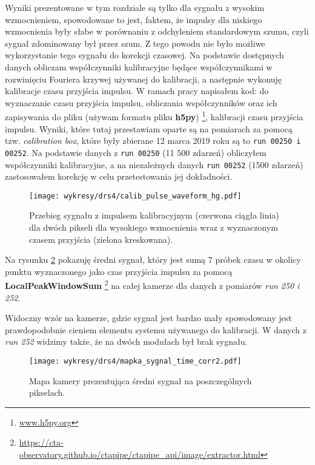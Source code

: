 \documentclass[a4paper,11pt,twoside]{article}
\begin{document}
Wyniki prezentowane w tym rozdziale są tylko dla sygnału z wysokim wzmocnieniem, spowodowane to jest, faktem, że impulsy dla niskiego wzmocnienia były słabe w porównaniu z odchyleniem standardowym szumu, czyli sygnał zdominowany był przez szum. Z tego powodu nie było możliwe wykorzystanie tego sygnału do korekcji czasowej. Na podstawie dostępnych danych obliczam współczynniki kalibracyjne będące współczynnikami w rozwinięciu Fouriera krzywej używanej do kalibracji, a następnie wykonuję kalibracje czasu przyjścia impulsu. W ramach pracy napisałem kod: do wyznaczanie czasu przyjścia impulsu, obliczania współczynników oraz ich zapisywania do pliku (używam formatu pliku {\bf{h5py}}) \footnote{\url{www.h5py.org}}, kalibracji czasu przyjścia impulsu. Wyniki, które tutaj przestawiam oparte są na pomiarach za pomocą tzw. \textsl{calibration box}, które były zbierane 12 marca 2019 roku są to \texttt{run 00250 i 00252}. Na podstawie danych z \texttt{run 00250} (11 500 zdarzeń) obliczyłem współczynniki kalibracyjne, a na niezależnych danych \texttt{run 00252} (1500 zdarzeń) zastosowałem korekcję w celu przetestowania jej dokładności. 
\begin{figure}[H] 
\centering
\texttt{[image: wykresy/drs4/calib\_pulse\_waveform\_hg.pdf]}
\caption{Przebieg sygnału z impulsem kalibracyjnym (czerwona ciągła linia) dla dwóch pikseli dla wysokiego wzmocnienia wraz z wyznaczonym czasem przyjścia (zielona kreskowana).}
\label{fig:calib_waveform_hg}
\end{figure}
Na rysunku \ref{fig:signal_map} pokazuję średni sygnał, który jest sumą 7 próbek czasu w okolicy punktu wyznaczonego jako czas przyjścia impulsu za pomocą {\bf{LocalPeakWindowSum}} \footnote{\url{https://cta-observatory.github.io/ctapipe/ctapipe_api/image/extractor.html}} na całej kamerze dla danych z pomiarów \textsl{run 250 i 252}. 

Widoczny wzór na kamerze, gdzie sygnał jest bardzo mały spowodowany jest prawdopodobnie cieniem elementu systemu używanego do kalibracji. W danych z \textsl{run 252} widzimy także, że na dwóch modułach był brak sygnału.
\begin{figure}[H] 
\centering
\texttt{[image: wykresy/drs4/mapka\_sygnal\_time\_corr2.pdf]}
\caption{Mapa kamery prezentująca średni sygnał na poszczególnych pikselach.}
\label{fig:signal_map}
\end{figure}
\newpage
\end{document}
